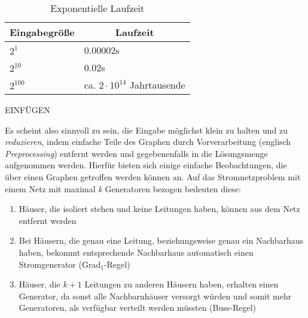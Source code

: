  \begin{table}[htb]
\caption{Exponentielle Laufzeit \label{tab:exponential}}
\vspace*{1em}
\centering

\bgroup
\def\arraystretch{1.3}%

\begin{threeparttable}

\begin{tabular}[c]{ l | l }
	
	\multicolumn{1}{c|}{\textbf{Eingabegröße}} & 
	\multicolumn{1}{c}{\textbf{Laufzeit}} \\ 
	
	\hline

	$2^{1}$& 0.00002s\\
	$2^{10}$& 0.02s\\
	$2^{100}$& ca. $ 2 \cdot 10^{14} $ Jahrtausende \\
	
\end{tabular}

\begin{tablenotes}\footnotesize
\item EINFÜGEN
\end{tablenotes}

\end{threeparttable}

\egroup

\end{table}
Es scheint also sinnvoll zu sein, die Eingabe möglichst klein zu halten und zu \emph{reduzieren}, indem einfache Teile des Graphen durch Vorverarbeitung (englisch \emph{Preprocessing}) entfernt werden und gegebenenfalls in die Lösungsmenge aufgenommen werden. Hierfür bieten sich einige einfache Beobachtungen, die über einen Graphen getroffen werden können an. Auf das Stromnetzproblem mit einem Netz mit maximal \emph{k} Generatoren bezogen bedeuten diese: 
\begin{enumerate}
\item Häuser, die isoliert stehen und keine Leitungen haben, können aus dem Netz entfernt werden
\item Bei Häusern, die genau eine Leitung, beziehungsweise genau ein Nachbarhaus haben, bekommt entsprechende Nachbarhaus automatisch einen Stromgenerator (Grad$_{1}$-Regel)
\item Häuser, die $k+1$ Leitungen zu anderen Häusern haben, erhalten einen Generator, da sonst alle Nachbarnhäuser versorgt würden und somit mehr Generatoren, als verfügbar verteilt werden müssten (Buss-Regel)
\end{enumerate}
